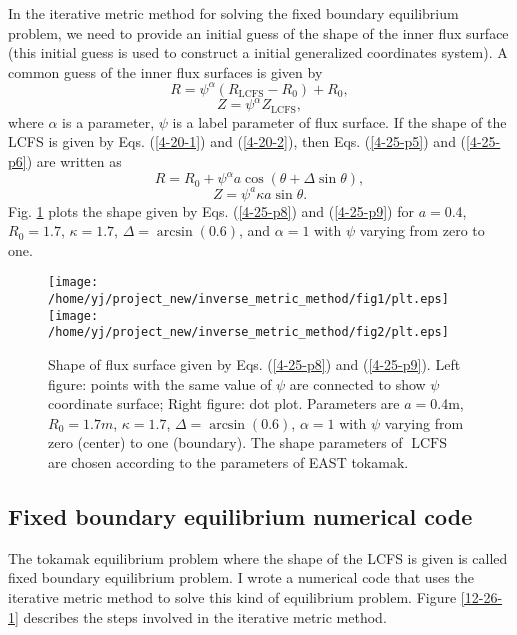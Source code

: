 \documentclass{article}
\newcommand{\tmop}[1]{\ensuremath{\operatorname{#1}}}
\begin{document}
In the iterative metric method{\cite{delucia1980}} for solving the fixed
boundary equilibrium problem, we need to provide an initial guess of the shape
of the inner flux surface (this initial guess is used to construct a initial
generalized coordinates system). A common guess of the inner flux surfaces is
given by
\begin{equation}
  \label{4-25-p5} R = \psi^{\alpha} (R_{\tmop{LCFS}} - R_0) + R_0,
\end{equation}
\begin{equation}
  \label{4-25-p6} Z = \psi^{\alpha} Z_{\tmop{LCFS}},
\end{equation}
where $\alpha$ is a parameter, $\psi$ is a label parameter of flux surface. If
the shape of the LCFS is given by Eqs. (\ref{4-20-1}) and (\ref{4-20-2}), then
Eqs. (\ref{4-25-p5}) and (\ref{4-25-p6}) are written as
\begin{equation}
  \label{4-25-p8} R = R_0 + \psi^{\alpha} a \cos (\theta + \Delta \sin
  \theta),
\end{equation}
\begin{equation}
  \label{4-25-p9} Z = \psi^a \kappa a \sin \theta .
\end{equation}
Fig. \ref{4-25-p10} plots the shape given by Eqs. (\ref{4-25-p8}) and
(\ref{4-25-p9}) for $a =$0.4, $R_0 = 1.7$, $\kappa = 1.7$, $\Delta = \arcsin
(0.6)$, and $\alpha = 1$ with $\psi$ varying from zero to one.

\begin{figure}[h]
  \texttt{[image: /home/yj/project\_new/inverse\_metric\_method/fig1/plt.eps]}\texttt{[image: /home/yj/project\_new/inverse\_metric\_method/fig2/plt.eps]}
  \caption{ \label{4-25-p10}Shape of flux surface given by Eqs.
  (\ref{4-25-p8}) and (\ref{4-25-p9}). Left figure: points with the same value
  of $\psi$ are connected to show $\psi$ coordinate surface; Right figure: dot
  plot. Parameters are $a =$0.4m, $R_0 = 1.7 m$, $\kappa = 1.7$, $\Delta =
  \arcsin (0.6)$, $\alpha = 1$ with $\psi$ varying from zero (center) to one
  (boundary). The shape parameters of $\tmop{LCFS}$ are chosen according to
  the parameters of EAST tokamak.}
\end{figure}

\subsection{Fixed boundary equilibrium numerical code}

The tokamak equilibrium problem where the shape of the LCFS is given is called
fixed boundary equilibrium problem. I wrote a numerical code that uses the
iterative metric method{\cite{delucia1980}} to solve this kind of equilibrium
problem. Figure \ref{12-26-1} describes the steps involved in the iterative
metric method.
\end{document}
